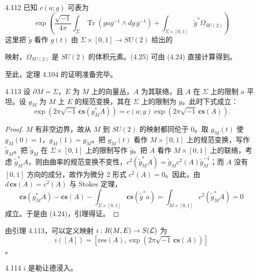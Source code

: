 \begin{remark}{4.112}
  已知 $c(a;g)$ 可表为
  \begin{equation}
    \exp\left(\frac{\sqrt{-1}}{4\pi}\int_\Sigma\operatorname{Tr}(gag^{-1}\wedge dg\,g^{-1})+\int_{\Sigma\times[0,1]}\tilde g^*\Omega_{SU(2)}\right) \tag{4.25}
  \end{equation}
  这里把 $\tilde g$ 看作 $g(t)$ 由 $\Sigma\times[0,1]\to SU(2)$ 给出的

  映射，$\Omega_{SU(2)}$ 是 $SU(2)$ 的体积元素。(4.25) 可由 (4.24) 直接计算得到。
\end{remark}

至此，定理 4.104 的证明准备完毕。

\begin{lemma*}{4.113}
  设 $\partial M=\Sigma$，$E$ 为 $M$ 上的向量丛，$A$ 为其联络，且 $A$ 在 $\Sigma$ 上的限制 $a$ 平坦。设 $g_M$ 为 $M$ 上 $E$ 的规范变换，其在 $\Sigma$ 上的限制为 $g$。此时下式成立：
  \[
    \exp(2\pi\sqrt{-1}\,\mathbf{cs}(g_M^*A))=c(a;g)\exp(2\pi\sqrt{-1}\,\mathbf{cs}(A)).
  \]
\end{lemma*}

\begin{proof}
  $M$ 有非空边界，故从 $M$ 到 $SU(2)$ 的映射都同伦于 0。取 $g_M(t)$ 使 $g_M(0)=1$，$g_M(1)=g_M$。把 $g_M(t)$ 看作 $M\times[0,1]$ 上的规范变换，写作 $\tilde g_M$。把 $\tilde g_M$ 在 $\Sigma\times[0,1]$ 上的限制写作 $\tilde g$。把 $A$ 看作 $M\times[0,1]$ 上的联络，考虑 $\tilde g_M^*A$，则由曲率的规范变换不变性，$c^2(\tilde g_M^*A)=\tilde g_Mc^2(A)\tilde g_M^{-1}$；而 $A$ 没有 $[0,1]$ 方向的成分，故作为微分 2 形式 $c^2(A)=0$。因此，由 $d\,\mathbf{cs}(A)=c^2(A)$ 与 Stokes 定理，
  \[
    \mathbf{cs}(g_M^*A)-\mathbf{cs}(A)-\int_{\Sigma\times[0,1]}\mathbf{cs}(\tilde g^*a)=\int_{M\times[0,1]}c^2(\tilde g_M^*A)=0
  \]
  成立。于是由 (4.24)，引理得证。
\end{proof}

由引理 4.113，可以定义映射 $i:R(M,E)\to S(\mathcal{L})$ 为
\[
  i([A])=[\mathrm{res}(A),\exp(2\pi\sqrt{-1}\,\mathbf{cs}(A))]
\]。

\begin{lemma*}{4.114}
  $i$ 是勒让德浸入。
\end{lemma*}

